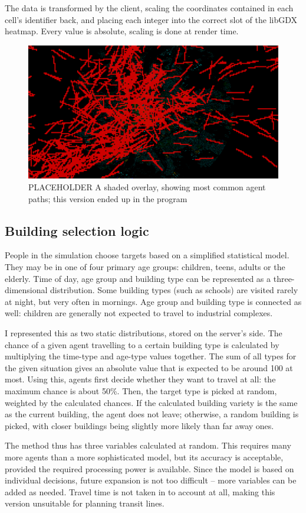 The data is transformed by the client, scaling the coordinates contained in each cell's identifier back, and placing each integer into the correct slot of the libGDX heatmap. Every value is absolute, scaling is done at render time.
\begin{figure}[h]
    \centering
    \includegraphics[width=140mm, keepaspectratio]{images/overlay_v2.png}
    \caption{PLACEHOLDER A shaded overlay, showing most common agent paths; this version ended up in the program\ \label{overlay_v3}}
\end{figure}

\subsection{Building selection logic}

People in the simulation choose targets based on a simplified statistical model. They may be in one of four primary age groups: children, teens, adults or the elderly. Time of day, age group and building type can be represented as a three-dimensional distribution. Some building types (such as schools) are visited rarely at night, but very often in mornings. Age group and building type is connected as well: children are generally not expected to travel to industrial complexes. 

I represented this as two static distributions, stored on the server's side. The chance of a given agent travelling to a certain building type is calculated by multiplying the time-type and age-type values together. The sum of all types for the given situation gives an absolute value that is expected to be around 100 at most. Using this, agents first decide whether they want to travel at all: the maximum chance is about 50\%. Then, the target type is picked at random, weighted by the calculated chances. If the calculated building variety is the same as the current building, the agent does not leave; otherwise, a random building is picked, with closer buildings being slightly more likely than far away ones.

The method thus has three variables calculated at random. This requires many more agents than a more sophisticated model, but its accuracy is acceptable, provided the required processing power is available. Since the model is based on individual decisions, future expansion is not too difficult -- more variables can be added as needed. Travel time is not taken in to account at all, making this version unsuitable for planning transit lines.